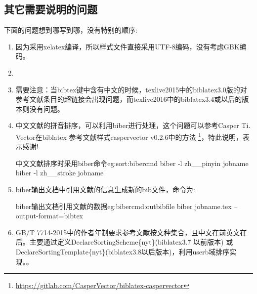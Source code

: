 \subsection{其它需要说明的问题}
下面的问题想到哪写到哪，没有特别的顺序:

\begin{enumerate}
  \item 因为采用xelatex编译，所以样式文件直接采用UTF-8编码，没有考虑GBK编码。

  \item {}

  \item 需要注意：当bibtex键中含有中文的时候，texlive2015中的biblatex3.0版的对参考文献条目的超链接会出现问题，而texlive2016中的biblatex3.4或以后的版本则没有问题。

  \item {\heiti 中文文献的拼音排序，可以利用biber进行处理，这个问题可以参考Casper Ti. Vector在biblatex 参考文献样式caspervector v0.2.6中的方法
      \footnote{\url{https://gitlab.com/CasperVector/biblatex-caspervector}}，特此说明，表示感谢!}

        \begin{codetex}{中文文献排序时采用biber命令}{eg:sort:bibercmd}
        biber -l zh__pinyin jobname
        biber -l zh__stroke jobname
        \end{codetex}

  \item biber输出文档中引用文献的信息生成新的bib文件，命令为:
        \begin{codetex}{biber输出文档引用文献的数据}{eg:bibercmd:outbibfile}
        biber jobname.tex --output-format=bibtex
        \end{codetex}


  \item GB/T 7714-2015中的作者年制要求参考文献按文种集合，且中文在前英文在后。主要通过定义DeclareSortingScheme\{nyt\}(biblatex3.7 以前版本) 或DeclareSortingTemplate\{nyt\}(biblatex3.8以后版本)，利用userb域排序实现。。



\end{enumerate}
